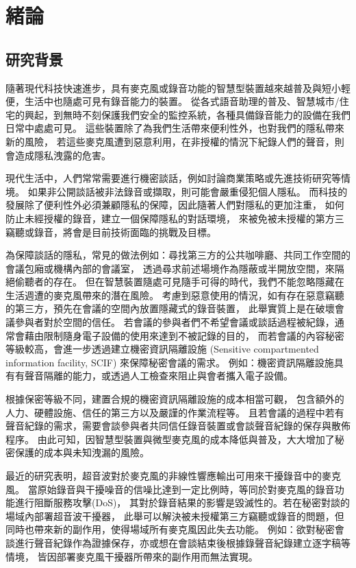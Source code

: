 \chapter{緒論}\label{chapter:intro}

\section{研究背景}\label{section:intro-background}

    隨著現代科技快速進步，具有麥克風或錄音功能的智慧型裝置越來越普及與短小輕便，生活中也隨處可見有錄音能力的裝置。
從各式語音助理的普及、智慧城市/住宅的興起，到無時不刻保護我們安全的監控系統，各種具備錄音能力的設備在我們日常中處處可見。
這些裝置除了為我們生活帶來便利性外，也對我們的隱私帶來新的風險，
若這些麥克風遭到惡意利用，在非授權的情況下紀錄人們的聲音，則會造成隱私洩露的危害。

    現代生活中，人們常常需要進行機密談話，例如討論商業策略或先進技術研究等情境。
如果非公開談話被非法錄音或擷取，則可能會嚴重侵犯個人隱私。
而科技的發展除了便利性外必須兼顧隱私的保障，因此隨著人們對隱私的更加注重，
如何防止未經授權的錄音，建立一個保障隱私的對話環境，
來被免被未授權的第方三竊聽或錄音，將會是目前技術面臨的挑戰及目標。

    為保障談話的隱私，常見的做法例如：尋找第三方的公共咖啡廳、共同工作空間的會議包廂或機構內部的會議室，
透過尋求前述場境作為隱蔽或半開放空間，來隔絕偷聽者的存在。
但在智慧裝置隨處可見隨手可得的時代，我們不能忽略隱藏在生活週遭的麥克風帶來的潛在風險。
考慮到惡意使用的情況，如有存在惡意竊聽的第三方，預先在會議的空間內放置隱藏式的錄音裝置，
此舉實質上是在破壞會議參與者對於空間的信任。
若會議的參與者們不希望會議或談話過程被紀錄，通常會藉由限制隨身電子設備的使用來達到不被記錄的目的，
而若會議的內容秘密等級較高，會進一步透過建立機密資訊隔離設施
(Sensitive compartmented information facility, SCIF) 來保障秘密會議的需求。
例如：機密資訊隔離設施具有有聲音隔離的能力，或透過人工檢查來阻止與會者攜入電子設備。

    根據保密等級不同，建置合規的機密資訊隔離設施的成本相當可觀，
包含額外的人力、硬體設施、信任的第三方以及嚴謹的作業流程等。
且若會議的過程中若有聲音紀錄的需求，需要會談參與者共同信任錄音裝置或會談聲音紀錄的保存與散佈程序。
由此可知，因智慧型裝置與微型麥克風的成本降低與普及，大大增加了秘密保護的成本與未知洩漏的風險。

    最近的研究表明，超音波對於麥克風的非線性響應輸出可用來干擾錄音中的麥克風。
當原始錄音與干擾噪音的信噪比達到一定比例時，等同於對麥克風的錄音功能進行阻斷服務攻擊(DoS)，
其對於錄音結果的影響是毀滅性的。若在秘密對談的場域內部署超音波干擾器，
此舉可以解決被未授權第三方竊聽或錄音的問題，但同時也帶來新的副作用，使得場域所有麥克風因此失去功能。
例如：欲對秘密會談進行聲音紀錄作為證據保存，亦或想在會談結束後根據錄聲音紀錄建立逐字稿等情境，
皆因部署麥克風干擾器所帶來的副作用而無法實現。

